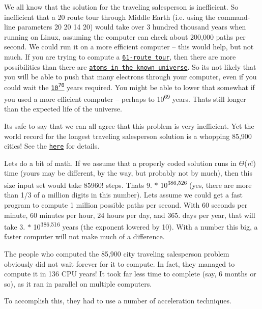 We all know that the solution for the traveling salesperson is inefficient. So inefficient that a 20 route tour through Middle Earth (i.\+e. using the command-\/line parameters { 20 20 14 20}) would take over 3 hundred thousand years when running on Linux, assuming the computer can check about 200,000 paths per second. We could run it on a more efficient computer -- this would help, but not much. If you are trying to compute a \href{https://www.google.com/search?q=61!}{\tt 61-\/route tour}, then there are more possibilities than there are \href{http://www.universetoday.com/36302/atoms-in-the-universe/}{\tt atoms in the known universe}. So it\textquotesingle{}s not likely that you will be able to push that many electrons through your computer, even if you could wait the \href{https://www.google.com/search?q=61!%2F(200000*60*60*24*365.25)}{\tt 10\textsuperscript{70}} years required. You might be able to lower that somewhat if you used a more efficient computer -- perhaps to 10\textsuperscript{69} years. That\textquotesingle{}s still longer than the expected life of the universe.

It\textquotesingle{}s safe to say that we can all agree that this problem is very inefficient. Yet the world record for the longest traveling salesperson solution is a whopping 85,900 cities! See the \href{http://en.wikipedia.org/wiki/Traveling_salesman_problem#Exact_algorithms}{\tt here} for details.

Let\textquotesingle{}s do a bit of math. If we assume that a properly coded solution runs in {$\Theta$}({\itshape n}!) time (yours may be different, by the way, but probably not by much), then this size input set would take 85960! steps. That\textquotesingle{}s 9. $\ast$ 10\textsuperscript{386,526} (yes, there are more than 1/3 of a million digits in this number). Let\textquotesingle{}s assume we could get a fast program to compute 1 million possible paths per second. With 60 seconds per minute, 60 minutes per hour, 24 hours per day, and 365. days per year, that will take 3. $\ast$ 10\textsuperscript{386,516} years (the exponent lowered by 10). With a number this big, a faster computer will not make much of a difference.

The people who computed the 85,900 city traveling salesperson problem obviously did not wait forever for it to compute. In fact, they managed to compute it in 136 C\+PU years! It took far less time to complete (say, 6 months or so), as it ran in parallel on multiple computers.

To accomplish this, they had to use a number of acceleration techniques.

